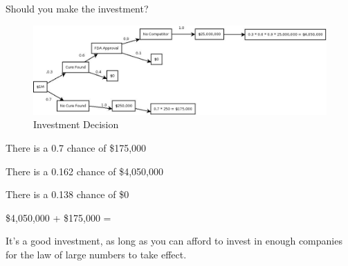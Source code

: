 \documentclass[letterpaper, landscape]{exam}
\begin{document}
  Should you make the investment? 


  \begin{figure}[H]
    \centering
    \includegraphics[scale = 0.25]{investment.jpeg}
    \caption{Investment Decision}
  \end{figure}

  \begin{solution}
    \begin{itemize*}
      \item There is a 0.7 chance of \$175,000 
      \item There is a 0.162 chance of \$4,050,000 
      \item There is a 0.138 chance of \$0
    \end{itemize*}
    
    \$4,050,000 + \$175,000 = 

    It's a good investment, as long as you can afford to invest in enough
    companies for the law of large numbers to take effect.

   \end{solution}
\end{document}

